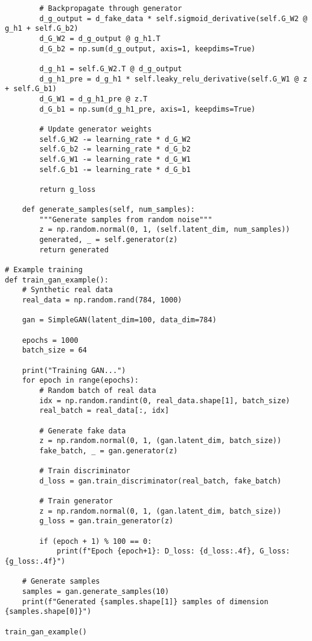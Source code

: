 ﻿\documentclass[12pt,a4paper]{article}
\begin{document}
\begin{lstlisting}
        # Backpropagate through generator
        d_g_output = d_fake_data * self.sigmoid_derivative(self.G_W2 @ g_h1 + self.G_b2)
        d_G_W2 = d_g_output @ g_h1.T
        d_G_b2 = np.sum(d_g_output, axis=1, keepdims=True)
        
        d_g_h1 = self.G_W2.T @ d_g_output
        d_g_h1_pre = d_g_h1 * self.leaky_relu_derivative(self.G_W1 @ z + self.G_b1)
        d_G_W1 = d_g_h1_pre @ z.T
        d_G_b1 = np.sum(d_g_h1_pre, axis=1, keepdims=True)
        
        # Update generator weights
        self.G_W2 -= learning_rate * d_G_W2
        self.G_b2 -= learning_rate * d_G_b2
        self.G_W1 -= learning_rate * d_G_W1
        self.G_b1 -= learning_rate * d_G_b1
        
        return g_loss
    
    def generate_samples(self, num_samples):
        """Generate samples from random noise"""
        z = np.random.normal(0, 1, (self.latent_dim, num_samples))
        generated, _ = self.generator(z)
        return generated

# Example training
def train_gan_example():
    # Synthetic real data
    real_data = np.random.rand(784, 1000)
    
    gan = SimpleGAN(latent_dim=100, data_dim=784)
    
    epochs = 1000
    batch_size = 64
    
    print("Training GAN...")
    for epoch in range(epochs):
        # Random batch of real data
        idx = np.random.randint(0, real_data.shape[1], batch_size)
        real_batch = real_data[:, idx]
        
        # Generate fake data
        z = np.random.normal(0, 1, (gan.latent_dim, batch_size))
        fake_batch, _ = gan.generator(z)
        
        # Train discriminator
        d_loss = gan.train_discriminator(real_batch, fake_batch)
        
        # Train generator
        z = np.random.normal(0, 1, (gan.latent_dim, batch_size))
        g_loss = gan.train_generator(z)
        
        if (epoch + 1) % 100 == 0:
            print(f"Epoch {epoch+1}: D_loss: {d_loss:.4f}, G_loss: {g_loss:.4f}")
    
    # Generate samples
    samples = gan.generate_samples(10)
    print(f"Generated {samples.shape[1]} samples of dimension {samples.shape[0]}")

train_gan_example()
\end{lstlisting}
\end{document}
